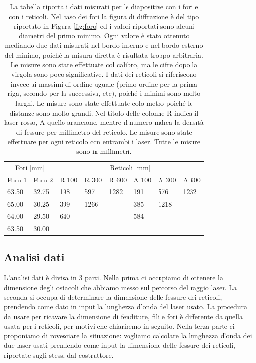 \begin{table}[b!]
    \centering
    \footnotesize
    \begin{tabular}{l l | l l l | l l l}
        \toprule
        \multicolumn{2}{c|}{Fori [mm]} & \multicolumn{6}{c}{Reticoli [mm]} \\[1mm]
        Foro 1 &      Foro 2 & R 100 &   R 300 &   R 600 & A 100 & A 300 & A 600\\
        \midrule
        63.50 &           32.75      & 198   &   597   &   1282  & 191   & 576   & 1232 \\
        65.00 &           30.25      & 399   &   1266  &         & 385   & 1218  &      \\
        64.00 &           29.50      & 640   &         &         & 584   &       &      \\
        63.50 &           30.00      &       &         &         &       &       &      \\
        \bottomrule
    \end{tabular}
    \caption{La tabella riporta i dati misurati per le diapositive con i fori e con i reticoli.
        Nel caso dei fori la figura di diffrazione è del tipo riportato in Figura \ref{fig:foro}
        ed i valori riportati sono alcuni diametri del primo minimo. Ogni valore è stato ottenuto mediando
        due dati misurati nel bordo interno e nel bordo esterno del minimo, poiché la misura diretta è risultata
        troppo arbitraria. Le misure sono state effettuate col calibro, ma le cifre dopo la virgola sono poco significative.
        I dati dei reticoli si riferiscono invece ai massimi di ordine uguale
        (primo ordine per la prima riga, secondo per la successiva, etc), poiché i minimi sono molto larghi.
        Le misure sono state effettuate colo metro poiché le distanze sono molto grandi. Nel titolo delle colonne R indica il laser
        rosso, A quello arancione, mentre il numero indica la densità di fessure per millimetro del reticolo. Le misure
        sono state effettuare per ogni reticolo con entrambi i laser. Tutte le misure sono in millimetri.}
    \label{tab:foret}
\end{table}

\subsection{Analisi dati}

L'analisi dati è divisa in 3 parti. Nella prima ci occupiamo di ottenere la dimensione degli ostacoli
che abbiamo messo sul percorso del raggio laser. La seconda si occupa di determinare la dimensione
delle fessure dei reticoli, prendendo come dato in input la lunghezza d'onda del laser usato.
La procedura da usare per ricavare la dimensione di fenditure, fili e fori è differente da quella usata
per i reticoli, per motivi che chiariremo in seguito.
Nella terza parte ci proponiamo di rovesciare la situazione: vogliamo calcolare la lunghezza d'onda dei due
laser usati prendendo come input la dimensione delle fessure dei reticoli, riportate sugli stessi dal costruttore.

